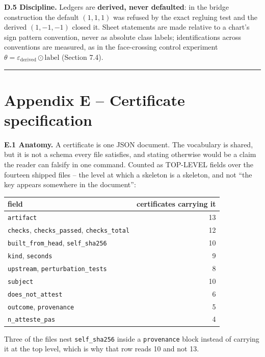 \textbf{D.5 Discipline.} Ledgers are \textbf{derived, never defaulted}: in the bridge construction the default \((1,1,1)\) was refused by the exact regluing test and the derived \((1,-1,-1)\) closed it. Sheet statements are made relative to a chart's sign pattern convention, never as absolute class labels; identifications across conventions are measured, as in the face-crossing control experiment \(\theta = \varepsilon_{\mathrm{derived}} \odot \text{label}\) (Section 7.4).

\begin{center}\rule{\linewidth}{0.5pt}\end{center}

\section{Appendix E -- Certificate specification}\label{appendix-e-certificate-specification}

\textbf{E.1 Anatomy.} A certificate is one JSON document. The vocabulary is shared, but it is not a schema every file satisfies, and stating otherwise would be a claim the reader can falsify in one command. Counted as TOP-LEVEL fields over the fourteen shipped files -- the level at which a skeleton is a skeleton, and not ``the key appears somewhere in the document'':

\begin{longtable}[]{@{}lr@{}}
\toprule\noalign{}
field & certificates carrying it \\
\midrule\noalign{}
\endhead
\bottomrule\noalign{}
\endlastfoot
\texttt{artifact} & 13 \\
\texttt{checks}, \texttt{checks\_\allowbreak{}passed}, \texttt{checks\_\allowbreak{}total} & 12 \\
\texttt{built\_\allowbreak{}from\_\allowbreak{}head}, \texttt{self\_\allowbreak{}sha256} & 10 \\
\texttt{kind}, \texttt{seconds} & 9 \\
\texttt{upstream}, \texttt{perturbation\_\allowbreak{}tests} & 8 \\
\texttt{subject} & 10 \\
\texttt{does\_\allowbreak{}not\_\allowbreak{}attest} & 6 \\
\texttt{outcome}, \texttt{provenance} & 5 \\
\texttt{n\_\allowbreak{}atteste\_\allowbreak{}pas} & 4 \\
\end{longtable}

Three of the files nest \texttt{self\_\allowbreak{}sha256} inside a \texttt{provenance} block instead of carrying it at the top level, which is why that row reads 10 and not 13.

